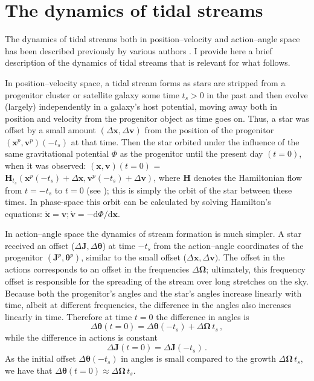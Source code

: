 \documentclass{emulateapj}
\newcommand{\dd}{\mathrm{d}}
\newcommand{\eg}{e.g.}
\renewcommand{\vec}[1]{\ensuremath{\mathbf{#1}}}
\newcommand{\vecx}{\ensuremath{\vec{x}}}
\newcommand{\vecv}{\ensuremath{\vec{v}}}
\newcommand{\vech}{\ensuremath{\vec{H}}}
\newcommand{\vecj}{\ensuremath{\vec{J}}}
\newcommand{\veco}{\ensuremath{\vec{\Omega}}}
\newcommand{\veca}{\ensuremath{\boldsymbol\theta}}
\newcommand{\ts}{\ensuremath{t_s}}
\begin{document}
\section{The dynamics of tidal streams}\label{sec:dynamics}

The dynamics of tidal streams both in position--velocity and
action--angle space has been described previously by various authors
\citep[\eg,][]{Helmi99a,Tremaine99a,Johnston99a,Sanders13b}. I provide
here a brief description of the dynamics of tidal streams that is
relevant for what follows.

In position--velocity space, a tidal stream forms as stars are
stripped from a progenitor cluster or satellite galaxy some time $\ts
> 0$ in the past and then evolve (largely) independently in a galaxy's
host potential, moving away both in position and velocity from the
progenitor object as time goes on. Thus, a star was offset by a small
amount $(\Delta \vecx,\Delta \vecv)$ from the position of the
progenitor $(\vecx^p,\vecv^p)(-\ts)$ at that time. Then the star
orbited under the influence of the same gravitational potential $\Phi$
as the progenitor until the present day $(t=0)$, when it was observed:
$(\vecx,\vecv)(t=0)$ = $\vech_{\ts}(\vecx^p(-\ts)+\Delta
\vecx,\vecv^p(-\ts)+\Delta \vecv)$, where $\vech$ denotes the
Hamiltonian flow from $t=-\ts$ to $t=0$ (see
\citealt{binneytremaine}); this is simply the orbit of the star
between these times. In phase-space this orbit can be calculated by
solving Hamilton's equations: $\dot{\vecx} = \vecv; \dot{\vecv} = -
\dd \Phi / \dd \vecx$.

In action--angle space the dynamics of stream formation is much
simpler. A star received an offset ($\Delta \vecj,\Delta \veca$) at
time $-\ts$ from the action--angle coordinates of the progenitor
$(\vecj^p,\veca^p)$, similar to the small offset ($\Delta \vecx,\Delta
\vecv)$. The offset in the actions corresponds to an offset in the
frequencies $\Delta \veco$; ultimately, this frequency offset is
responsible for the spreading of the stream over long stretches on the
sky. Because both the progenitor's angles and the star's angles
increase linearly with time, albeit at different frequencies, the
difference in the angles also increases linearly in time. Therefore at
time $t=0$ the difference in angles is
\begin{equation}
\Delta \veca(t=0) = \Delta \veca(-\ts) + \Delta \veco \,\ts\,,
\end{equation}
while the difference in actions is constant
\begin{equation}
\Delta \vecj(t=0) = \Delta \vecj(-\ts)\,.
\end{equation}
As the initial offset $\Delta \veca(-\ts)$ in angles is small compared
to the growth $\Delta \veco \,\ts$, we have that $\Delta \veca(t=0)
\approx \Delta \veco \,\ts$.
\end{document}

